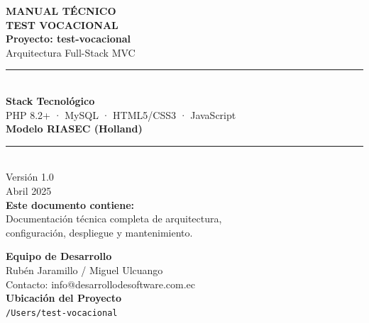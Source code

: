 \documentclass[12pt, a4paper]{report}
\begin{document}
\begin{titlepage}
    \centering
    \vspace*{2cm}
    
    {\Huge \textbf{MANUAL TÉCNICO}}\\[0.5cm]
    {\Huge \textbf{TEST VOCACIONAL}}\\[2cm]
    
   
    
    {\Large \textbf{Proyecto: test-vocacional}}\\[0.5cm]
    {\large Arquitectura Full-Stack MVC}\\[1.5cm]
    
    \rule{\textwidth}{0.4pt}\\[1cm]
    {\large \textbf{Stack Tecnológico}}\\
    {\large PHP 8.2+ · MySQL · HTML5/CSS3 · JavaScript}\\[1cm]
    {\large \textbf{Modelo RIASEC (Holland)}}\\[1cm]
    \rule{\textwidth}{0.4pt}\\[2cm]
    
    {\large Versión 1.0}\\[0.5cm]
    {\large Abril 2025}\\[3cm]
    
    {\normalsize \textbf{Este documento contiene:}}\\
    {\normalsize Documentación técnica completa de arquitectura,}\\
    {\normalsize configuración, despliegue y mantenimiento.}
    
    \vfill
\end{titlepage}

\newpage
\thispagestyle{empty}
\vspace*{5cm}
\begin{flushleft}
    {\large \textbf{Equipo de Desarrollo}}\\[0.5cm]
    Rubén Jaramillo / Miguel Ulcuango \\[0.2cm]
    Contacto: info@desarrollodesoftware.com.ec \\[2cm]
    
    {\large \textbf{Ubicación del Proyecto}}\\[0.5cm]
    \texttt{/Users/test-vocacional} \\[2cm]
\end{flushleft}
\end{document}
